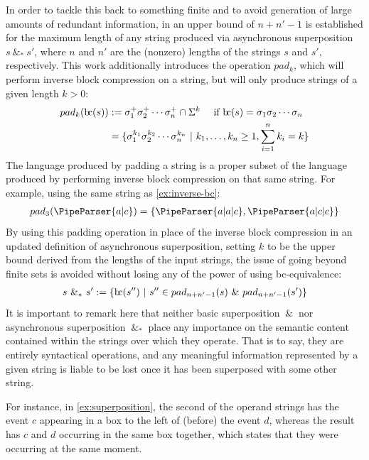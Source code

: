 \documentclass[a4paper,12pt,leqno]{article}
\newcommand{\bc}{{\rm b\!c}}
\newcommand{\vph}[1]{\vphantom{#1}}
\newcommand{\ebox}[1]{\fbox{$\vph{'(),}#1$}}
\renewcommand{\sp}{~\&~}
\newcommand{\spasync}{~\&_*~}
\newcommand{\EventString}[1]{%
	\renewcommand*{\do}[1]{\ebox{##1}}%
	\PipeParser{#1}%
}
\begin{document}
In order to tackle this back to something finite and to avoid generation of large amounts of redundant information, in \citet[p. 127]{woods2017towards} an upper bound of $n + n' - 1$\label{def:sp-upper-bound-length} is established for the maximum length of any string produced via asynchronous superposition $s \spasync s'$, where $n$ and $n'$ are the (nonzero) lengths of the strings $s$ and $s'$, respectively. This work additionally introduces the operation $pad_k$, which will perform inverse block compression on a string, but will only produce strings of a given length $k > 0$:
\begin{align}\label{def:padk}
	pad_k(\bc(s)) &:= \sigma_1^+ \sigma_2^+ \cdots \sigma_n^+ \cap \Sigma^k ~~~ \mbox{ if } \bc(s) = \sigma_1 \sigma_2 \cdots \sigma_n\\
	&=\{\sigma_1^{k_1}\sigma_2^{k_2}\cdots\sigma_n^{k_n} ~|~ k_1,\ldots,k_n \ge 1, \sum_{i = 1}^{n}k_i = k  \}\notag
\end{align}
The language produced by padding a string is a proper subset of the language produced by performing inverse block compression on that same string. For example, using the same string as \cref{ex:inverse-bc}:
\begin{align}\label{ex:padk}
	pad_3(\EventString{a|c}) = \{\EventString{a|a|c}, \EventString{a|c|c}\}
\end{align}
By using this padding operation in place of the inverse block compression in an updated definition of asynchronous superposition, setting $k$ to be the upper bound derived from the lengths of the input strings, the issue of going beyond finite sets is avoided without losing any of the power of using \bc-equivalence:
\begin{align}\label{def:async-superposition}
	s \spasync s' := \{\bc(s'') ~|~ s'' \in pad_{n+n'-1}(s) \sp pad_{n+n'-1}(s')\}
\end{align}
It is important to remark here that neither basic superposition $\sp$ nor asynchronous superposition $\spasync$ place any importance on the semantic content contained within the strings over which they operate. That is to say, they are entirely syntactical operations, and any meaningful information represented by a given string is liable to be lost once it has been superposed with some other string.

For instance, in \cref{ex:superposition}, the second of the operand strings has the event $c$ appearing in a box to the left of (before) the event $d$, whereas the result has $c$ and $d$ occurring in the same box together, which states that they were occurring at the same moment.
\end{document}
